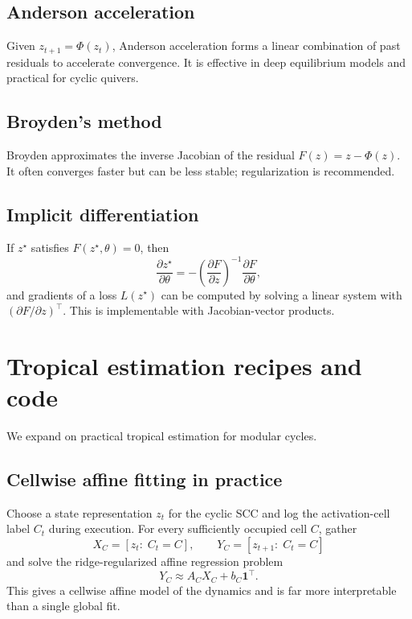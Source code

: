 \documentclass[11pt]{article}
\theoremstyle{definition}
\theoremstyle{plain}
\theoremstyle{remark}
\begin{document}
\subsection{Anderson acceleration}
Given $z_{t+1}=\Phi(z_t)$, Anderson acceleration forms a linear combination of past residuals to accelerate convergence.
It is effective in deep equilibrium models and practical for cyclic quivers.

\subsection{Broyden's method}
Broyden approximates the inverse Jacobian of the residual $F(z)=z-\Phi(z)$.
It often converges faster but can be less stable; regularization is recommended.

\subsection{Implicit differentiation}
If $z^\star$ satisfies $F(z^\star,\theta)=0$, then
\[
\frac{\partial z^\star}{\partial \theta} = -\left(\frac{\partial F}{\partial z}\right)^{-1}\frac{\partial F}{\partial \theta},
\]
and gradients of a loss $L(z^\star)$ can be computed by solving a linear system with $(\partial F/\partial z)^\top$.
This is implementable with Jacobian-vector products.

\section{Tropical estimation recipes and code}
\label{app:tropical-estimation}

We expand on practical tropical estimation for modular cycles.

\subsection{Cellwise affine fitting in practice}
Choose a state representation $z_t$ for the cyclic SCC and log the activation-cell label $C_t$ during execution.
For every sufficiently occupied cell $C$, gather
\[
X_C=[z_t:\; C_t=C],\qquad Y_C=[z_{t+1}:\; C_t=C]
\]
and solve the ridge-regularized affine regression problem
\[
Y_C \approx A_C X_C + b_C \mathbf{1}^\top.
\]
This gives a cellwise affine model of the dynamics and is far more interpretable than a single global fit.
\end{document}
